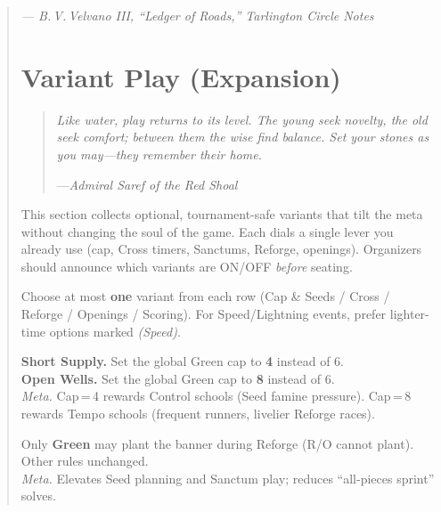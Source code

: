 \documentclass[11pt]{article}
\begin{document}
\begin{quote}
\begin{tcolorbox}[enhanced,breakable,
  colback=royal!3, colframe=royal!70!black, boxrule=0.6pt,
  title={Fenwood’s Memorandum on the Canray Theory}]
\begin{enumerate}[leftmargin=*,itemsep=0.5em,label=\textbf{Thesis \Roman*.}]
\end{enumerate}

\raggedleft\emph{— B.\,V.\,Velvano III, “Ledger of Roads,” Tarlington Circle Notes}\par
\end{tcolorbox}

\clearpage

\section{Variant Play (Expansion)}
\label{sec:variant-play}

\begin{quote}\small\itshape
Like water, play returns to its level. The young seek novelty, the old seek comfort; between them the wise find balance. Set your stones as you may—they remember their home.
\par\hfill—\textit{Admiral Saref of the Red Shoal}
\end{quote}

\noindent
This section collects optional, tournament-safe variants that tilt the meta without changing the soul of the game. Each dials a single lever you already use (cap, Cross timers, Sanctums, Reforge, openings). Organizers should announce which variants are ON/OFF \emph{before} seating.

\medskip
\begin{tcolorbox}[enhanced,colback=royal!3,colframe=royal!70!black,boxrule=0.6pt,title={How to Use These}]
\small
Choose at most \textbf{one} variant from each row (Cap \& Seeds / Cross / Reforge / Openings / Scoring). For Speed/Lightning events, prefer lighter-time options marked \emph{(Speed)}.
\end{tcolorbox}

\begin{rulevariant}[title={Short Supply / Open Wells (Green Cap Dials)}]
\textbf{Short Supply.} Set the global Green cap to \textbf{4} instead of 6.\\
\textbf{Open Wells.} Set the global Green cap to \textbf{8} instead of 6.\\[0.3em]
\textit{Meta.} Cap\,=\,4 rewards Control schools (Seed famine pressure). Cap\,=\,8 rewards Tempo schools (frequent runners, livelier Reforge races).
\end{rulevariant}

\begin{rulevariant}[title={Greens-Only Plant (Runner Restriction)}]
Only \textbf{Green} may plant the banner during Reforge (R/O cannot plant). Other rules unchanged.\\
\textit{Meta.} Elevates Seed planning and Sanctum play; reduces “all-pieces sprint” solves.
\end{rulevariant}


\end{quote}
\end{document}
